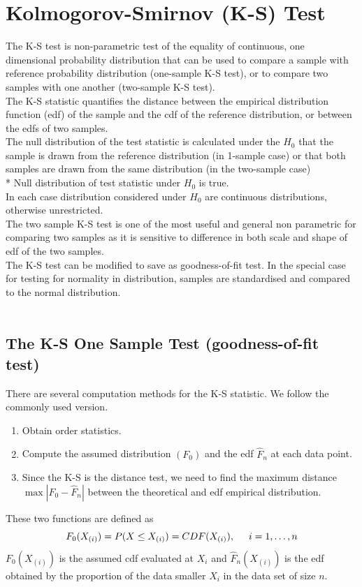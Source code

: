 \documentclass[11pt,a4paper]{article}
\theoremstyle{definition}
\begin{document}
\section{Kolmogorov-Smirnov (K-S) Test}
The K-S test is non-parametric test of the equality of continuous, one dimensional probability distribution that can be used to compare a sample with reference probability distribution (one-sample K-S test), or to compare two samples with one another (two-sample K-S test).\\ 
The K-S statistic quantifies the distance between the empirical distribution function (edf) of the sample and the cdf of the reference distribution, or between the edfs of two samples.\\ The null distribution of the test statistic is calculated under the $H_0$ that the sample is drawn from the reference distribution (in 1-sample case) or that both samples are drawn from the same distribution (in the two-sample case)\\* Null distribution of test statistic under $H_0$ is true.\\ In each case distribution  considered  under $H_0$ are continuous distributions, otherwise unrestricted.\\ 
The two sample K-S test is one of the most useful and general non parametric for comparing two samples as it is sensitive to difference in both scale and shape of edf of the two samples.\\ 
The K-S test can be modified to save as goodness-of-fit test. In the special case for testing for normality in distribution, samples are standardised and compared to the normal distribution.\\\\









\subsection{The K-S One Sample Test (goodness-of-fit test)}
There are several computation methods for the K-S statistic. We follow the commonly used version.
\begin{enumerate}
\item Obtain order statistics.
\item Compute the assumed distribution $(F_0)$ and the edf $\widehat{F}_n$ at each data point.
\item Since the K-S is the distance test, we need to find the maximum distance $\max|F_0-\widehat{F}_n|$ between the theoretical and edf empirical distribution.
\end{enumerate}
These two functions are defined as $$F_0(X_{(i)})=P(X\leq X_{(i)})=CDF(X_{(i)}),\hspace{0.5cm} i=1,\dots,n$$ $F_0(X_{(i)})$ is the assumed cdf evaluated at $X_i$ and $\widehat{F}_n(X_{(i)})$ is the edf obtained by the proportion of the data smaller $X_i$ in the data set of size $n$.
\end{document}
